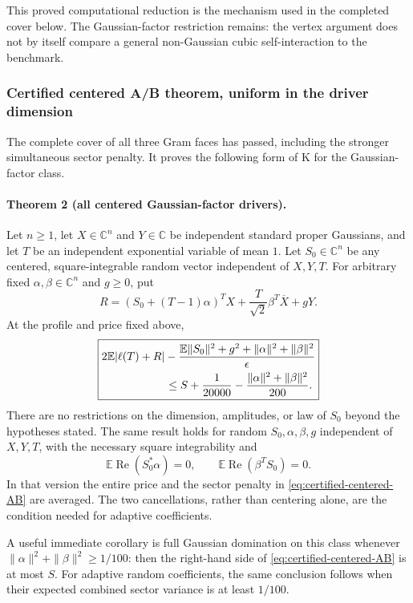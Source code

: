This proved computational reduction is the mechanism used in the
completed cover below.  The Gaussian-factor restriction remains: the
vertex argument does not by itself compare a general non-Gaussian cubic
self-interaction to the benchmark.

\subsubsection{Certified centered A/B theorem, uniform in the driver dimension}
\label{sec:certified-centered-AB}

The complete cover of all three Gram faces has passed, including the
stronger simultaneous sector penalty.  It proves the following form of K
for the Gaussian-factor class.

\paragraph{Theorem 2 (all centered Gaussian-factor drivers).}
Let $n\ge1$, let $X\in\mathbb C^n$ and $Y\in\mathbb C$ be independent
standard proper Gaussians, and let $T$ be an independent exponential
variable of mean $1$.  Let $S_0\in\mathbb C^n$ be any centered,
square-integrable random vector independent of $X,Y,T$.  For arbitrary
fixed $\alpha,\beta\in\mathbb C^n$ and $g\ge0$, put
\[
 R=(S_0+(T-1)\alpha)^TX+\frac{T}{\sqrt2}\beta^T\overline X+gY.
\]
At the profile and price fixed above,
\begin{equation}
 \boxed{\begin{aligned}
 &2\mathbb E|\ell(T)+R|
 -\frac{\mathbb E\|S_0\|^2+g^2+\|\alpha\|^2+\|\beta\|^2}{\epsilon}\\
 &\hspace{20mm}\le S+\frac1{20000}
            -\frac{\|\alpha\|^2+\|\beta\|^2}{200}.
 \end{aligned}}
 \label{eq:certified-centered-AB}
\end{equation}
There are no restrictions on the dimension, amplitudes, or law of $S_0$
beyond the hypotheses stated.  The same result holds for random
$S_0,\alpha,\beta,g$ independent of $X,Y,T$, with the necessary square
integrability and
\[
 \mathbb E\operatorname{Re}(S_0^*\alpha)=0,
 \qquad \mathbb E\operatorname{Re}(\beta^TS_0)=0.
\]
In that version the entire price and the sector penalty in
\eqref{eq:certified-centered-AB} are averaged.  The two cancellations, rather than centering alone, are the
condition needed for adaptive coefficients.

A useful immediate corollary is full Gaussian domination on this class
whenever $\|\alpha\|^2+\|\beta\|^2\ge1/100$: then the right-hand side
of \eqref{eq:certified-centered-AB} is at most $S$.  For adaptive random
coefficients, the same conclusion follows when their expected combined
sector variance is at least $1/100$.

